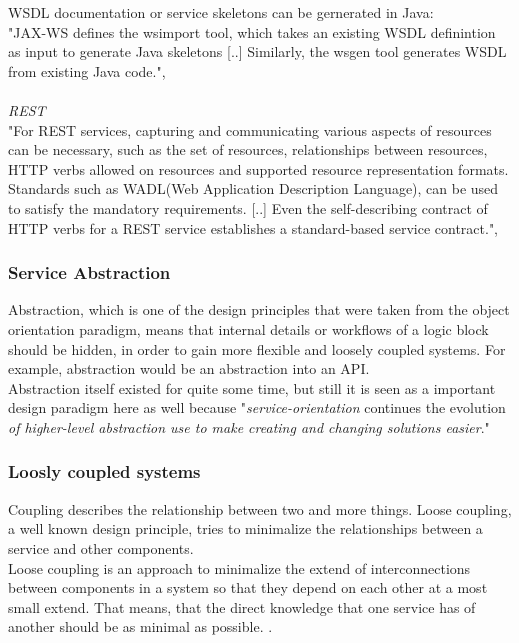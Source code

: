 \documentclass[12pt]{article}
\begin{document}
WSDL documentation or service skeletons can be gernerated in Java:\\ 
"JAX-WS defines the wsimport tool, which takes an existing WSDL definintion as input to generate Java skeletons [..] Similarly, the wsgen tool generates WSDL from existing Java code.",\cite[page 151]{grau}
 \\\\\noindent\textit{REST}\\
"For REST services, capturing and communicating various aspects of resources can be necessary, such as the set of resources, relationships between resources, HTTP verbs allowed on resources and supported resource representation formats. Standards such as WADL(Web Application Description Language), can be used to satisfy the mandatory requirements. [..] Even the self-describing contract of HTTP verbs for a REST service establishes a standard-based service contract.", \cite[page 151]{grau}\newpage
\subsubsection{Service Abstraction}
Abstraction, which is one of the design principles that were taken from the object orientation paradigm, means that internal details or workflows of a logic block should be hidden, in order to gain more flexible and loosely coupled systems. \cite[page 87]{te} For example, abstraction would be an abstraction into an API.\\
Abstraction itself existed for quite some time, but still it is seen as a important design paradigm here as well because "\textit{service-orientation} continues the evolution \textit{of higher-level abstraction use to make creating and changing solutions easier}."\cite[page 184]{grau}
\subsubsection{Loosly coupled systems}
Coupling describes the relationship between two and more things. Loose coupling, a well known design principle,  tries to minimalize the relationships between a service and other components. \cite[page 87]{te} \\
Loose coupling is an approach to minimalize the extend of interconnections between components in a system so that they depend on each other at a most small extend. That means, that the direct knowledge that one service has of another should be as minimal as possible. \cite{loosecoupldef}.
\end{document}
